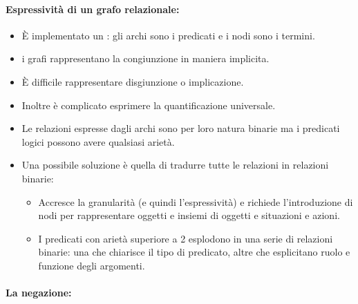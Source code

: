 \paragraph{Espressività di un grafo relazionale:}

\begin{itemize}
  \item È implementato un : gli archi sono i predicati e i nodi sono i termini. 
  \item {} i grafi rappresentano la congiunzione in maniera implicita. 
  \item È difficile rappresentare disgiunzione o implicazione. 
  \item Inoltre è complicato esprimere la quantificazione universale. 
  \item Le relazioni espresse dagli archi sono per loro natura binarie ma i predicati logici possono avere qualsiasi arietà.
  \item Una possibile soluzione è quella di tradurre tutte le relazioni in relazioni binarie:
    \begin{itemize}
      \item Accresce la granularità (e quindi l'espressività) e richiede l'introduzione di nodi per rappresentare oggetti e insiemi di oggetti e situazioni e azioni. 
      \item I predicati con arietà superiore a 2 esplodono in una serie di relazioni binarie: una che chiarisce il tipo di predicato, altre che esplicitano ruolo e funzione degli argomenti.
    \end{itemize}
\end{itemize}




\paragraph{La negazione:}

